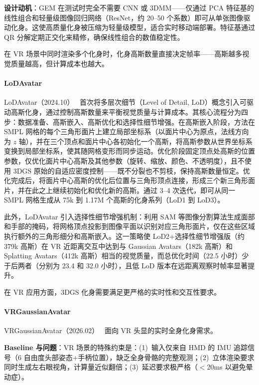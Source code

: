 \textbf{设计动机}：GEM 在测试时完全不需要 CNN 或 3DMM——仅通过 PCA 特征基的线性组合和轻量级图像回归网络（ResNet，约 20--50 个系数）即可从单张图像驱动化身。这使高质量化身被压缩为轻量级模型，适合实时移动端部署。特征基通过 QR 分解定期正交化来精修，确保线性组合的数值稳定性。

在 VR 场景中同时渲染多个化身时，化身高斯数量直接决定帧率——高斯越多视觉质量越高，但计算成本也越大。

\paragraph{LoDAvatar}

LoDAvatar（2024.10）~\cite{2410_20789} 首次将多层次细节（Level of Detail, LoD）概念引入可驱动高斯化身，通过控制高斯数量来平衡视觉质量与计算成本。其核心流程分为四步：数据准备、高斯嵌入、高斯优化和选择性细节增强。在高斯嵌入阶段，方法在 SMPL 网格的每个三角形面片上建立局部坐标系（以面片中心为原点，法线方向为 $z$ 轴），并在三个顶点和面片中心各初始化一个高斯，将高斯参数从世界坐标系变换到局部坐标系，使其随网格变形而同步运动。优化阶段固定顶点处高斯的位置参数，仅优化面片中心高斯及其他参数（旋转、缩放、颜色、不透明度），且不使用 3DGS 原始的自适应密度控制——既不分裂也不剪枝，保持高斯数量恒定。优化完成后，将面片中心高斯的优化后位置与三角形顶点连接，形成三个新三角形面片，并在此之上继续初始化和优化新的高斯。通过 3--4 次迭代，即可从同一 SMPL 网格生成从 75k 到 1.17M 个高斯的化身系列（LoD1 到 LoD3）。

此外，LoDAvatar 引入选择性细节增强机制：利用 SAM 等图像分割算法生成面部和手部的掩码，将网格顶点投影到图像平面以识别对应三角形面片，仅在这些区域执行额外的三角形细分和高斯嵌入。这一策略使 LoD2+选择性细节增强版（约 379k 高斯）在 VR 近距离交互中达到与 Gaussian Avatars（182k 高斯）和 Splatting Avatars（412k 高斯）相当的视觉质量，而总优化时间（22.5 小时）少于后两者（分别为 23.4 和 32.0 小时），且低 LoD 版本在远距离观察时帧率显著提升。

在 VR 应用方面，3DGS 化身需要满足更严格的实时性和交互性要求。

\paragraph{VRGaussianAvatar}

VRGaussianAvatar（2026.02）~\cite{2602_01674} 面向 VR 头显的实时全身化身需求。

\textbf{Baseline 与问题}：VR 场景的特殊约束是：(1)~输入仅来自 HMD 的 IMU 追踪信号（6 自由度头部姿态+手柄位置），缺乏全身骨骼的完整观测；(2)~立体渲染要求同时生成左右眼视角，计算量近似翻倍；(3)~延迟要求极严格（$<$20ms 以避免晕动症）。

